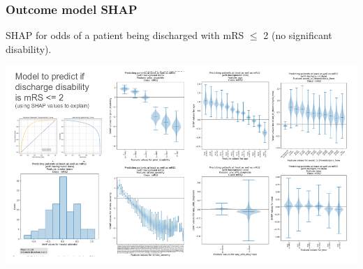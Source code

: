 \begin{frame}
\frametitle{Outcome model SHAP}

SHAP for odds of a patient being discharged with mRS $\leq$ 2 (no significant disability).


\begin{center}
\includegraphics[width=1.01\textwidth]{./images_outcome/stroke_outcome_shap}
\end{center}


\end{frame}